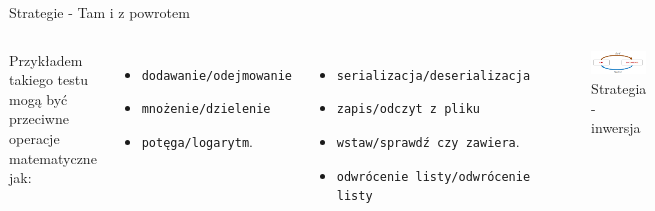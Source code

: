 \documentclass[polish,aspectratio=169]{beamer}
\begin{document}
\begin{frame}{Strategie - Tam i z powrotem}
    \begin{columns}[t]
            Przykładem takiego testu mogą być przeciwne operacje matematyczne jak:
            \begin{itemize}[<+->]
                \item \texttt{dodawanie/odejmowanie}
                \item \texttt{mnożenie/dzielenie}
                \item \texttt{potęga/logarytm}.
            \end{itemize} 
            \begin{itemize}[<+->]
                \item \texttt{serializacja/deserializacja}
                \item \texttt{zapis/odczyt z pliku}
                \item \texttt{wstaw/sprawdź czy zawiera}.
                \item \texttt{odwrócenie listy/odwrócenie listy}
            \end{itemize} 
        \centering
        \begin{figure}
            \centering
            \includegraphics[width=1\textwidth]{images/property_inverse.png}
            \caption{Strategia - inwersja}
            \label{fig:inverse_strategy}
        \end{figure}    
    \end{columns}
\end{frame}
\end{document}
